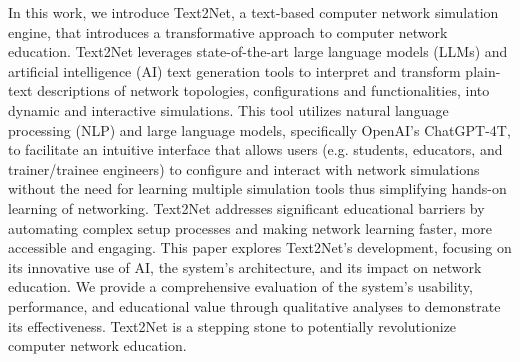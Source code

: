 In this work, we introduce Text2Net, a text-based computer network simulation engine, that introduces a transformative approach to computer network education. Text2Net leverages state-of-the-art large language models (LLMs) and artificial intelligence (AI) text generation tools to interpret and transform plain-text descriptions of network topologies, configurations and functionalities, into dynamic and interactive simulations. This tool utilizes natural language processing (NLP) and large language models, specifically OpenAI's ChatGPT-4T, to facilitate an intuitive interface that allows users (e.g. students, educators, and trainer/trainee engineers) to configure and interact with network simulations without the need for learning multiple simulation tools thus simplifying hands-on learning of networking. Text2Net addresses significant educational barriers by automating complex setup processes and making network learning faster, more accessible and engaging. This paper explores Text2Net's development, focusing on its innovative use of AI, the system's architecture, and its impact on network education. We provide a comprehensive evaluation of the system's usability, performance, and educational value through qualitative analyses to demonstrate its effectiveness. Text2Net is a stepping stone to potentially revolutionize computer network education.
  